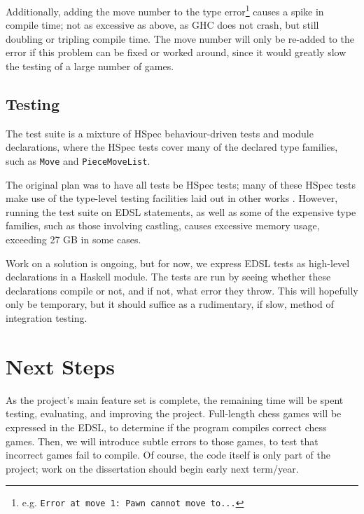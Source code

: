 \documentclass[12pt, a4paper, bibliography=totocnumbered]{scrartcl}
\begin{document}
Additionally, adding the move number to the type error\footnote{e.g. \lstinline{Error at move 1: Pawn cannot move to...}} causes a spike in compile time; not as excessive as above, as GHC does not crash, but still doubling or tripling compile time. The move number will only be re-added to the error if this problem can be fixed or worked around, since it would greatly slow the testing of a large number of games.

\subsection{Testing}

The test suite is a mixture of HSpec behaviour-driven tests \cite{hspec} and module declarations, where the HSpec tests cover many of the declared type families, such as \lstinline{Move} and \lstinline{PieceMoveList}.

The original plan was to have all tests be HSpec tests; many of these HSpec tests make use of the type-level testing facilities laid out in other works \cite{mezzo}. However, running the test suite on EDSL statements, as well as some of the expensive type families, such as those involving castling, causes excessive memory usage, exceeding 27 GB in some cases.

Work on a solution is ongoing, but for now, we express EDSL tests as high-level declarations in a Haskell module. The tests are run by seeing whether these declarations compile or not, and if not, what error they throw. This will hopefully only be temporary, but it should suffice as a rudimentary, if slow, method of integration testing.

\section{Next Steps}

As the project's main feature set is complete, the remaining time will be spent testing, evaluating, and improving the project. Full-length chess games will be expressed in the EDSL, to determine if the program compiles correct chess games. Then, we will introduce subtle errors to those games, to test that incorrect games fail to compile. Of course, the code itself is only part of the project; work on the dissertation should begin early next term/year.

\end{document}
